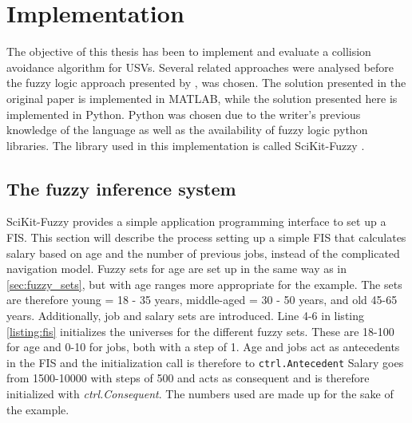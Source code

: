 

\chapter{Implementation}
\label{chap_impl}
The objective of this thesis has been to implement and evaluate a  collision avoidance  algorithm for USVs. Several related approaches were analysed before the fuzzy logic approach presented by \textcite{perera2012intelligent}, was chosen.
The solution presented in the original paper is implemented in MATLAB, while the solution presented here is implemented in Python. Python was chosen due to the writer's previous knowledge of the language as well as the availability of fuzzy logic python libraries. The library used in this implementation is called SciKit-Fuzzy \cite{josh_warner_2017_1002946}.

\section{The fuzzy inference system}
SciKit-Fuzzy provides a simple application programming interface to set up a FIS. This section will describe the process setting up a simple FIS that calculates salary based on age and the number of previous jobs, instead of the complicated navigation model. Fuzzy sets for age are set up in the same way as in \ref{sec:fuzzy_sets}, but with age ranges more appropriate for the example. The sets are therefore young = 18 - 35 years, middle-aged = 30 - 50 years, and old 45-65 years.  Additionally, job and salary sets are introduced. Line 4-6 in listing \ref{listing:fis} initializes the universes for the different fuzzy sets. These are 18-100 for age and 0-10 for jobs, both with a step of 1. Age and jobs act as antecedents in the FIS and the initialization call is therefore to  \texttt{ctrl.Antecedent} Salary goes from 1500-10000 with steps of 500 and acts as consequent and is therefore initialized with  \textit{ctrl.Consequent}. The numbers used are made up for the sake of the example.

